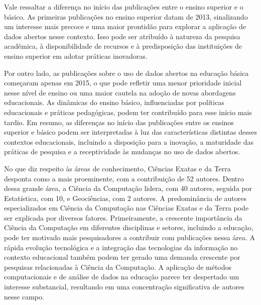 \documentclass[portuguese]{textolivre}
\begin{document}
Vale ressaltar a diferença no início das publicações entre o ensino superior e o básico. As primeiras publicações no ensino superior datam de 2013, sinalizando um interesse mais precoce e uma maior prontidão para explorar a aplicação de dados abertos nesse contexto. Isso pode ser atribuído à natureza da pesquisa acadêmica, à disponibilidade de recursos e à predisposição das instituições de ensino superior em adotar práticas inovadoras.

Por outro lado, as publicações sobre o uso de dados abertos na educação básica começaram apenas em 2015, o que pode refletir uma menor prioridade inicial nesse nível de ensino ou uma maior cautela na adoção de novas abordagens educacionais. As dinâmicas do ensino básico, influenciadas por políticas educacionais e práticas pedagógicas, podem ter contribuído para esse início mais tardio. Em resumo, as diferenças no início das publicações entre os ensinos superior e básico podem ser interpretadas à luz das características distintas desses contextos educacionais, incluindo a disposição para a inovação, a maturidade das práticas de pesquisa e a receptividade às mudanças no uso de dados abertos.

No que diz respeito às áreas de conhecimento, Ciências Exatas e da Terra desponta como a mais proeminente, com a contribuição de 52 autores. Dentro dessa grande área, a Ciência da Computação lidera, com 40 autores, seguida por Estatística, com 10, e Geociências, com 2 autores. A predominância de autores especializados em Ciência da Computação nas Ciências Exatas e da Terra pode ser explicada por diversos fatores. Primeiramente, a crescente importância da Ciência da Computação em diferentes disciplinas e setores, incluindo a educação, pode ter motivado mais pesquisadores a contribuir com publicações nessa área. A rápida evolução tecnológica e a integração das tecnologias da informação no contexto educacional também podem ter gerado uma demanda crescente por pesquisas relacionadas à Ciência da Computação. A aplicação de métodos computacionais e de análise de dados na educação parece ter despertado um interesse substancial, resultando em uma concentração significativa de autores nesse campo. 
\end{document}
